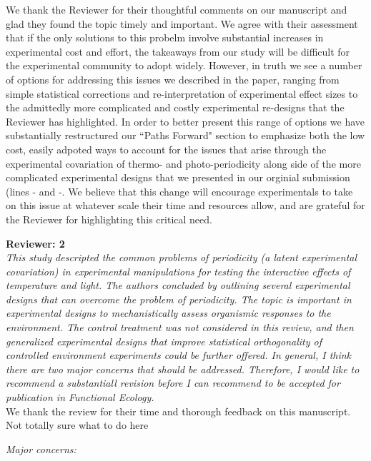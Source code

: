 \documentclass[11pt]{article}
\begin{document}
 We thank the Reviewer for their thoughtful comments on our manuscript and glad they found the topic timely and important. We agree with their assessment that if the only solutions to this probelm involve substantial increases in experimental cost and effort, the takeaways from our study will be difficult for the experimental community to adopt widely. However, in truth we see a number of options for addressing this issues we described in the paper, ranging from simple statistical corrections and re-interpretation of experimental effect sizes to the admittedly more complicated and costly experimental re-designs that the Reviewer has highlighted. In order to better present this range of options we have substantially restructured our ``Paths Forward" section to emphasize both the low cost, easily adpoted ways to account for the issues that arise through the experimental covariation of thermo- and photo-periodicity along side of the more complicated experimental designs that we presented in our orginial submission (lines - and -. We believe that this change will encourage experimentals to take on this issue at whatever scale their time and resources allow, and are grateful for the Reviewer for highlighting this critical need.

\textbf{Reviewer: 2}\\
\emph{This study descripted the common problems of periodicity (a latent experimental covariation) in experimental manipulations for testing the interactive effects of temperature and light. The authors concluded by outlining several experimental designs that can overcome the problem of periodicity. The topic is important in experimental designs to mechanistically assess organismic responses to the environment. The control treatment was not considered in this review, and then generalized experimental designs that improve statistical orthogonality of controlled environment experiments could be further offered. In general, I think there are two major concerns that should be addressed. Therefore, I would like to recommend a substantiall revision before I can recommend to be accepted for publication in Functional Ecology.}\\

We  thank the review for their time and thorough feedback on this manuscript. Not totally sure what to do here

\emph{Major concerns:}
\end{document}
